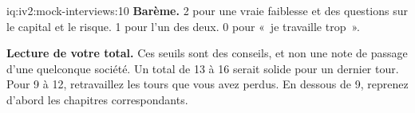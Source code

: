 \begin{solution}{iq:iv2:mock-interviews:10}
\textbf{Barème.} 2 pour une vraie faiblesse et des questions sur le capital et le risque. 1 pour l'un des deux. 0 pour «~je travaille trop~».

\medskip
\textbf{Lecture de votre total.} Ces seuils sont des conseils, et non une note de passage d'une quelconque société. Un total de 13 à 16 serait solide pour un dernier tour. Pour 9 à 12, retravaillez les tours que vous avez perdus. En dessous de 9, reprenez d'abord les chapitres correspondants.

\end{solution}
